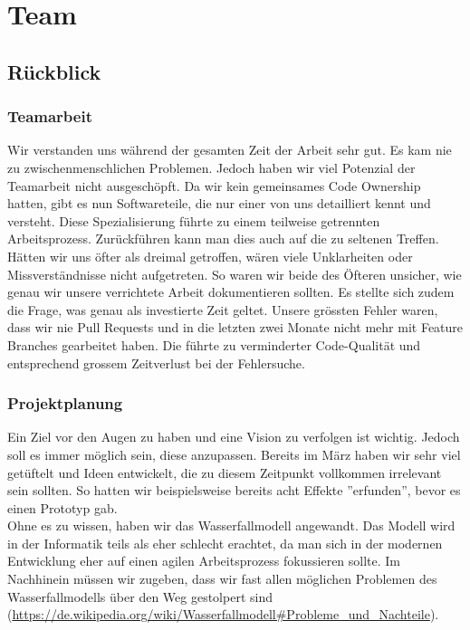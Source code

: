 \chapter{Team}

\section{Rückblick}

\subsection*{Teamarbeit}
Wir verstanden uns während der gesamten Zeit der Arbeit sehr gut. Es kam nie zu zwischenmenschlichen Problemen. Jedoch haben wir viel Potenzial der Teamarbeit nicht ausgeschöpft.
Da wir kein gemeinsames Code Ownership hatten, gibt es nun Softwareteile, die nur einer von uns detailliert kennt und versteht. Diese Spezialisierung führte zu einem teilweise getrennten Arbeitsprozess. Zurückführen kann man dies auch auf die zu seltenen
Treffen. Hätten wir uns öfter als dreimal getroffen, wären viele Unklarheiten oder Missverständnisse nicht aufgetreten. So waren wir beide des Öfteren unsicher, wie genau wir unsere verrichtete Arbeit
dokumentieren sollten. Es stellte sich zudem die Frage, was genau als investierte Zeit geltet.
Unsere grössten Fehler waren, dass wir nie Pull Requests und in die letzten zwei Monate nicht mehr mit Feature Branches gearbeitet haben. Die führte zu verminderter Code-Qualität
und entsprechend grossem Zeitverlust bei der Fehlersuche.


\subsection*{Projektplanung}
Ein Ziel vor den Augen zu haben und eine Vision zu verfolgen ist wichtig. Jedoch soll es
immer möglich sein, diese anzupassen. Bereits im März haben wir sehr viel getüftelt und Ideen entwickelt, die zu diesem Zeitpunkt vollkommen irrelevant sein sollten.
So hatten wir beispielsweise bereits acht Effekte ''erfunden'', bevor es einen Prototyp gab.\\
Ohne es zu wissen, haben wir das Wasserfallmodell angewandt. Das Modell wird in der Informatik teils als eher schlecht erachtet, da man sich in der modernen
Entwicklung eher auf einen agilen Arbeitsprozess fokussieren sollte. Im Nachhinein müssen wir zugeben, dass wir fast allen möglichen Problemen des Wasserfallmodells
über den Weg gestolpert sind (\url{https://de.wikipedia.org/wiki/Wasserfallmodell#Probleme_und_Nachteile}).


